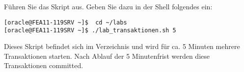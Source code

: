         \item F\"uhren Sie das Skript  aus. Geben Sie dazu in der Shell folgendes ein:
\begin{lstlisting}[language=terminal]
[oracle@FEA11-119SRV ~]$  cd ~/labs
[oracle@FEA11-119SRV ~]$ ./lab_transaktionen.sh 5
\end{lstlisting}
        Dieses Skript befindet sich im Verzeichnis  und wird f\"ur ca. 5  Minuten mehrere Transaktionen starten. Nach Ablauf der 5 Minutenfrist werden diese Transaktionen committed.
